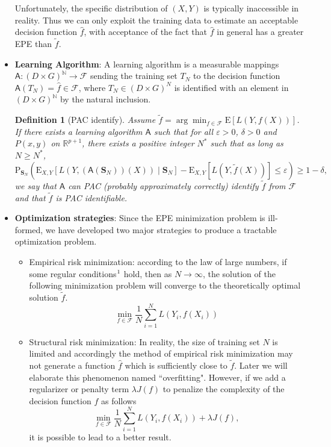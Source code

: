 \documentclass{report}
\newtheorem{definition}{Definition}[chapter]
\theoremstyle{nonumberplain}
\newcommand{\0}{\mathbf{0}}
\begin{document}
\begin{itemize}
	Unfortunately, the specific distribution of $(X,Y)$ is typically inaccessible in reality. Thus we can only exploit the training data to estimate an acceptable decision function $\hat{f}$, with acceptance of the fact that $\hat{f}$ in general has a greater EPE than $\tilde{f}$. 
	
	\item \textbf{Learning Algorithm}: 
	A learning algorithm is a measurable mappings $\mathsf{A}:(D\times G)^\mathbb{N}\to \mathcal{F}$ sending the training set $T_N$ to the decision function $\mathsf{A}(T_N)=\hat{f}\in \mathcal{F}$, where $T_N\in(D\times G)^N$ is identified with an element in $(D\times G)^\mathbb{N}$ by the natural inclusion.
	\begin{definition}[PAC identify]
		Assume $\tilde{f}=\arg\min_{f\in\mathcal{F}}\mathrm{E}[L(Y,f(X))]
		$. If there exists a learning algorithm $\mathsf{A}$ such that for all $\varepsilon>0$, $\delta>0$ and $P(x,y)$ on $\mathbb{R}^{p+1}$, there exists a positive integer $N^*$ such that as long as $N\ge N^*$,
		\[
		\mathrm{P}_{\mathbf{S}_N}\left(\mathrm{E}_{X,Y}[L(Y,(\mathsf{A}(\mathbf{S}_N))(X))\mid \mathbf{S}_N]-\mathrm{E}_{X,Y}[L(Y,\tilde{f}(X))] \le \varepsilon\right) \ge 1-\delta,
		\]
		we say that $\mathsf{A}$ can PAC (probably approximately correctly) identify $\tilde{f}$ from $\mathcal{F}$ and that $\tilde{f}$ is PAC identifiable.
	\end{definition}
	
	\item \textbf{Optimization strategies}: Since the EPE minimization problem is ill-formed, we have developed two major strategies to produce a tractable optimization problem. 
	\begin{itemize}
		\item Empirical risk minimization: according to the law of large numbers, if some regular conditions$\footnote{For example, the uniform law of large numbers can be applied here. The details are consigned to the appendix.}$ hold, then as $N\to\infty$, the solution of the following minimization problem will converge to the theoretically optimal solution $\tilde{f}$.
		\[
		\min_{f\in\mathcal{F}}\frac{1}{N}\sum_{i=1}^{N}L(Y_i,f(X_i))
		\]
		
		\item Structural risk minimization: In reality, the size of training set $N$ is limited and accordingly the method of empirical risk minimization may not generate a function $\hat{f}$ which is sufficiently close to $\tilde{f}$. Later we will elaborate this phenomenon named ``overfitting". However, if we add a regularizer or penalty term $\lambda J(f)$ to penalize the complexity of the decision function $f$ as follows
		\[
		\min_{f\in\mathcal{F}}\frac{1}{N}\sum_{i=1}^{N}L(Y_i,f(X_i))+\lambda J(f),
		\]
		it is possible to lead to a better result.
	\end{itemize} 
	
\end{itemize} 
\end{document}
